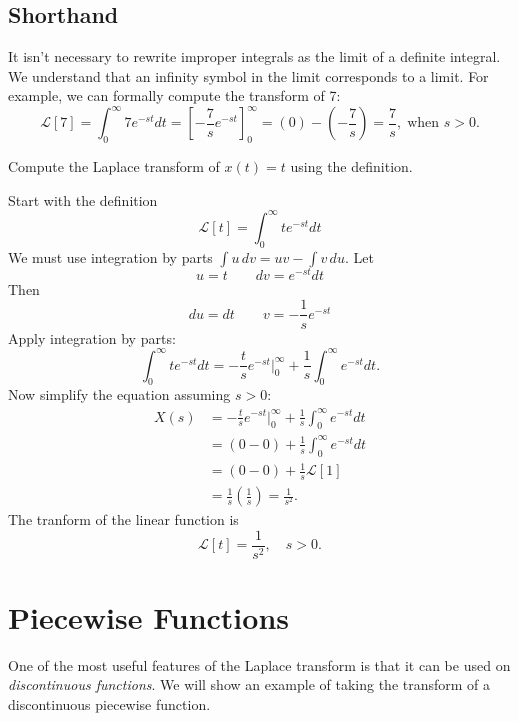\documentclass[10pt,letterpaper]{article}
\begin{document}
\subsection{Shorthand}
It isn't necessary to rewrite improper integrals as the limit of a definite integral. We understand that an infinity symbol in the limit corresponds to a limit. For example, we can formally compute the transform of 7:
$$
\mathcal{L}[7] = \int_0^\infty7e^{-st}dt = \left[-\frac{7}{s}e^{-st}\right]_0^\infty=(0)-\left(-\frac{7}{s}\right)=\frac{7}{s},\; \text{when }s>0.
$$

\begin{example}[3]{
Compute the Laplace transform of $x(t)=t$ using the definition.
}

Start with the definition 
\[
\mathcal{L}[t]=\int_0^\infty t e^{-st}dt
\]
We must use integration by parts $\int u\,dv = uv - \int v\,du$. Let
\[
u=t
\qquad
dv=e^{-st}dt
\]
Then
\[
du=dt
\qquad
v=-\frac{1}{s}e^{-st}
\]
Apply integration by parts:
\[
\int_0^\infty t e^{-st}dt =
-\frac{t}{s}e^{-st}\Big|_0^\infty
+
\frac{1}{s}\int_0^\infty e^{-st}dt.
\]
Now simplify the equation assuming $s>0$:
\begin{align*}
X(s) &= -\frac{t}{s}e^{-st}\Big|_0^\infty + \frac{1}{s}\int_0^\infty e^{-st}dt\\
&=(0-0)+ \frac{1}{s}\int_0^\infty e^{-st}dt\\
&=(0-0)+ \frac{1}{s}\mathcal{L}[1]\\
&=\frac{1}{s}\left(\frac{1}{s}\right)=\frac{1}{s^2}.
\end{align*}
The tranform of the linear function is
\[
\boxed{\mathcal{L}[t]=\frac{1}{s^2},\quad s>0.}
\]
\end{example}

\section{Piecewise Functions}
One of the most useful features of the Laplace transform is that it can be used on \textit{discontinuous functions}. We will show an example of taking the transform of a discontinuous piecewise function.
\end{document}
